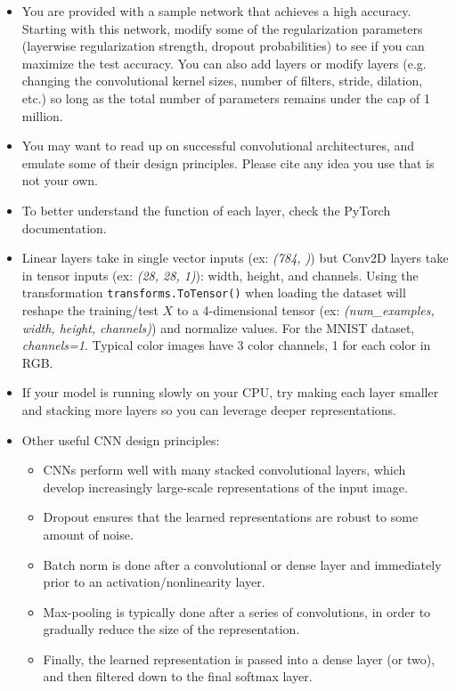 \begin{itemize}
	\item You are provided with a sample network that achieves a high accuracy. Starting with this network, modify some of the regularization parameters (layerwise regularization strength, dropout probabilities) to see if you can maximize the test accuracy. You can also add layers or modify layers (e.g.
	changing the convolutional kernel sizes, number of filters, stride, dilation, etc.) so long as the total number of parameters remains under the cap of 1 million.
  \item You may want to read up on successful convolutional architectures, and emulate some of their design principles. Please cite any idea you use that is not your own.
  \item To better understand the function of each layer, check the PyTorch documentation.
  \item Linear layers take in single vector inputs (ex: \emph{(784, )}) but Conv2D layers
	take in tensor inputs (ex: \emph{(28, 28, 1)}): width, height, and channels. Using the transformation \verb$transforms.ToTensor()$ when loading the dataset will reshape the training/test $X$ to a 4-dimensional tensor (ex: \emph{(num_examples, width, height, channels)}) and normalize values. For the MNIST dataset, \emph{channels=1}. Typical color images have 3 color channels, 1 for each color in RGB.
	\item If your model is running slowly on your CPU, try making each layer smaller
	and stacking more layers so you can leverage deeper representations.
	\item Other useful CNN design principles:
  \begin{itemize}
    \item CNNs perform well with many stacked convolutional layers, which develop increasingly large-scale representations of the input image.
    \item Dropout ensures that the learned representations are robust to some amount of noise.
    \item Batch norm is done after a convolutional or dense layer and immediately prior to an activation/nonlinearity layer.
    \item Max-pooling is typically done after a series of convolutions, in order to gradually reduce the size of the representation.
    \item Finally, the learned representation is passed into a dense layer (or two), and then filtered down to the final softmax layer.
  \end{itemize}
\end{itemize}

